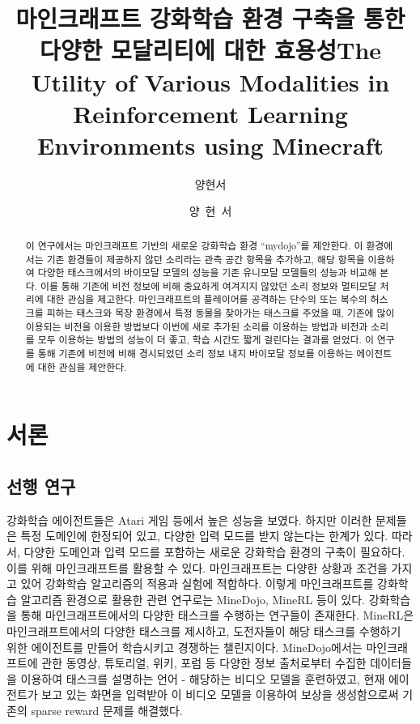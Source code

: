\documentclass[oneside, under, ko]{snuthesis}
\title{마인크래프트 강화학습 환경 구축을 통한 다양한 모달리티에 대한 효용성}
\title*{The Utility of Various Modalities in Reinforcement Learning Environments using Minecraft}
\author{양현서}
\author*{양~현~서} %
\begin{document}
\makefrontcover

\cleardoublepage

\renewcommand{\abstractname}{국문초록}
\begin{abstract}
	이 연구에서는 마인크래프트 기반의 새로운 강화학습 환경 “mydojo”를 제안한다. 이 환경에서는 기존 환경들이 제공하지 않던 소리라는 관측 공간 항목을 추가하고, 해당 항목을 이용하여 다양한 태스크에서의 바이모달 모델의 성능을 기존 유니모달 모델들의 성능과 비교해 본다. 이를 통해 기존에 비전 정보에 비해 중요하게 여겨지지 않았던 소리 정보와 멀티모달 처리에 대한 관심을 제고한다. 마인크래프트의 플레이어를 공격하는 단수의 또는 복수의 허스크를 피하는 태스크와 목장 환경에서 특정 동물을 찾아가는 태스크를 주었을 때, 기존에 많이 이용되는 비전을 이용한 방법보다 이번에 새로 추가된 소리를 이용하는 방법과 비전과 소리를 모두 이용하는 방법의 성능이 더 좋고, 학습 시간도 짧게 걸린다는 결과를 얻었다. 이 연구를 통해 기존에 비전에 비해 경시되었던 소리 정보 내지 바이모달 정보를 이용하는 에이전트에 대한 관심을 제안한다.
\end{abstract}

\tableofcontents

\cleardoublepage

\doublespacing
\renewcommand{\baselinestretch}{1.7}
\chapter{서론}

\section{선행 연구}
강화학습 에이전트들은 Atari 게임 등에서 높은 성능을 보였다. 하지만 이러한 문제들은 특정 도메인에 한정되어 있고, 다양한 입력 모드를 받지 않는다는 한계가 있다. 따라서, 다양한 도메인과 입력 모드를 포함하는 새로운 강화학습 환경의 구축이 필요하다. 이를 위해 마인크래프트를 활용할 수 있다. 마인크래프트는 다양한 상황과 조건을 가지고 있어 강화학습 알고리즘의 적용과 실험에 적합하다. 이렇게 마인크래프트를 강화학습 알고리즘 환경으로 활용한 관련 연구로는 MineDojo, MineRL 등이 있다. 강화학습을 통해 마인크래프트에서의 다양한 태스크를 수행하는 연구들이 존재한다. MineRL은 마인크래프트에서의 다양한 태스크를 제시하고, 도전자들이 해당 태스크를 수행하기 위한 에이전트를 만들어 학습시키고 경쟁하는 챌린지이다. \cite{minerl} MineDojo에서는 마인크래프트에 관한 동영상, 튜토리얼, 위키, 포럼 등 다양한 정보 출처로부터 수집한 데이터들을 이용하여 태스크를 설명하는 언어 - 해당하는 비디오 모델을 훈련하였고, 현재 에이전트가 보고 있는 화면을 입력받아 이 비디오 모델을 이용하여 보상을 생성함으로써 기존의 sparse reward 문제를 해결했다. \cite{minedojo}
\end{document}
